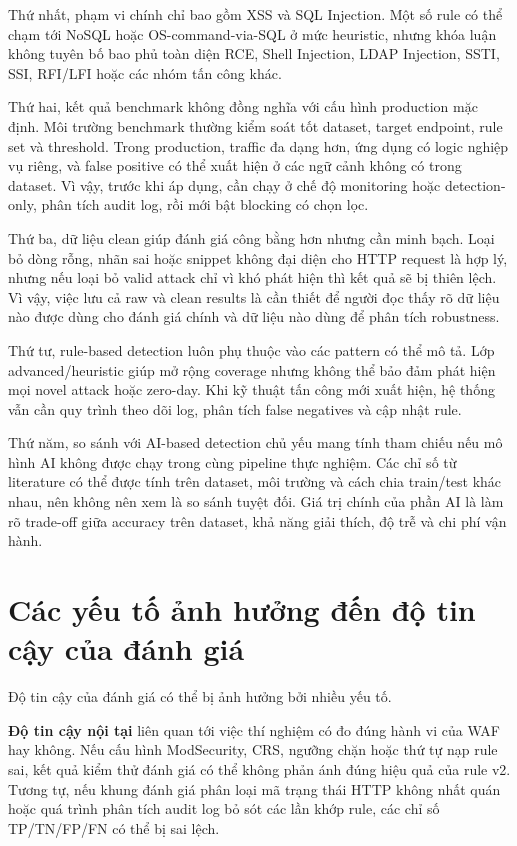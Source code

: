 Thứ nhất, phạm vi chính chỉ bao gồm XSS và SQL Injection. Một số rule có thể chạm tới NoSQL hoặc OS-command-via-SQL ở mức heuristic, nhưng khóa luận không tuyên bố bao phủ toàn diện RCE, Shell Injection, LDAP Injection, SSTI, SSI, RFI/LFI hoặc các nhóm tấn công khác.

Thứ hai, kết quả benchmark không đồng nghĩa với cấu hình production mặc định. Môi trường benchmark thường kiểm soát tốt dataset, target endpoint, rule set và threshold. Trong production, traffic đa dạng hơn, ứng dụng có logic nghiệp vụ riêng, và false positive có thể xuất hiện ở các ngữ cảnh không có trong dataset. Vì vậy, trước khi áp dụng, cần chạy ở chế độ monitoring hoặc detection-only, phân tích audit log, rồi mới bật blocking có chọn lọc.

Thứ ba, dữ liệu clean giúp đánh giá công bằng hơn nhưng cần minh bạch. Loại bỏ dòng rỗng, nhãn sai hoặc snippet không đại diện cho HTTP request là hợp lý, nhưng nếu loại bỏ valid attack chỉ vì khó phát hiện thì kết quả sẽ bị thiên lệch. Vì vậy, việc lưu cả raw và clean results là cần thiết để người đọc thấy rõ dữ liệu nào được dùng cho đánh giá chính và dữ liệu nào dùng để phân tích robustness.

Thứ tư, rule-based detection luôn phụ thuộc vào các pattern có thể mô tả. Lớp advanced/heuristic giúp mở rộng coverage nhưng không thể bảo đảm phát hiện mọi novel attack hoặc zero-day. Khi kỹ thuật tấn công mới xuất hiện, hệ thống vẫn cần quy trình theo dõi log, phân tích false negatives và cập nhật rule.

Thứ năm, so sánh với AI-based detection chủ yếu mang tính tham chiếu nếu mô hình AI không được chạy trong cùng pipeline thực nghiệm. Các chỉ số từ literature có thể được tính trên dataset, môi trường và cách chia train/test khác nhau, nên không nên xem là so sánh tuyệt đối. Giá trị chính của phần AI là làm rõ trade-off giữa accuracy trên dataset, khả năng giải thích, độ trễ và chi phí vận hành.

\section{Các yếu tố ảnh hưởng đến độ tin cậy của đánh giá}
\label{sec:threats-to-validity}

Độ tin cậy của đánh giá có thể bị ảnh hưởng bởi nhiều yếu tố.

\textbf{Độ tin cậy nội tại} liên quan tới việc thí nghiệm có đo đúng hành vi của WAF hay không. Nếu cấu hình ModSecurity, CRS, ngưỡng chặn hoặc thứ tự nạp rule sai, kết quả kiểm thử đánh giá có thể không phản ánh đúng hiệu quả của rule v2. Tương tự, nếu khung đánh giá phân loại mã trạng thái HTTP không nhất quán hoặc quá trình phân tích audit log bỏ sót các lần khớp rule, các chỉ số TP/TN/FP/FN có thể bị sai lệch.

